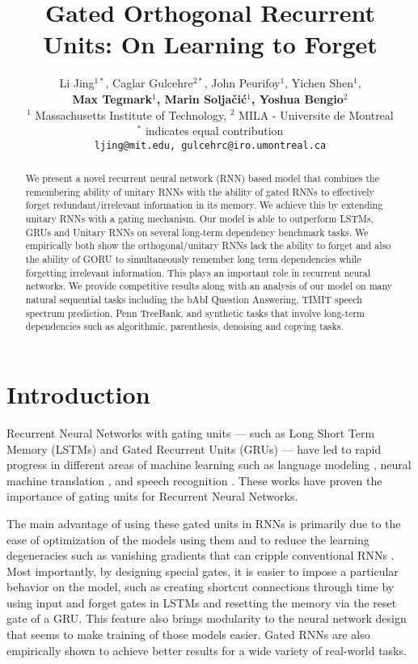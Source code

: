\documentclass[letterpaper]{article} \usepackage{aaai18}  \usepackage{times}  \usepackage{helvet}  \usepackage{courier}  \usepackage{url}  \usepackage{graphicx}
\title{Gated Orthogonal Recurrent Units: On Learning to Forget}
\author{
Li Jing$^{1*}$, Caglar Gulcehre$^{2*}$, John Peurifoy$^1$, Yichen Shen$^1$, \\
{ \bf \Large
  Max Tegmark$^1$,  Marin Solja\v{c}i\'{c}$^1$, Yoshua Bengio$^2$}\\
  $^1$ Massachusetts Institute of Technology,  
  $^2$ MILA - Universite de Montreal \\ 
  $^*$ indicates equal contribution\\
  \texttt{ljing@mit.edu, gulcehrc@iro.umontreal.ca} \\
}
\begin{document}
\maketitle
\begin{abstract}
We present a novel recurrent neural network (RNN) based model that combines the remembering ability of unitary RNNs with the ability of gated RNNs to effectively forget redundant/irrelevant information in its memory.  We achieve this by extending unitary RNNs with a gating mechanism. Our model is able to outperform LSTMs, GRUs and Unitary RNNs on several long-term dependency benchmark tasks. We empirically both show the orthogonal/unitary RNNs lack the ability to forget and also the ability of GORU to simultaneously remember long term dependencies while forgetting irrelevant information. This plays an important role in recurrent neural networks. We provide competitive results along with an analysis of our model on many natural sequential tasks including the bAbI Question Answering, TIMIT speech spectrum prediction, Penn TreeBank, and synthetic tasks that involve long-term dependencies such as algorithmic, parenthesis, denoising and copying tasks.
\end{abstract}


\section{Introduction}





Recurrent Neural Networks with gating units --- such as Long Short Term Memory (LSTMs) \cite{hochreiter1997long,felix2001long} and Gated Recurrent Units (GRUs) \cite{cho2014learning} --- have led to rapid progress in different areas of machine learning such as language modeling \cite{graves2014neural}, neural machine translation \cite{cho2014learning,sutskever2014sequence}, and speech recognition \cite{chan2015listen,chorowski2015attention}. These works have proven the importance of gating units for Recurrent Neural Networks.

The main advantage of using these gated units in RNNs is primarily due to the ease of optimization of the models using them and to reduce the learning degeneracies such as vanishing gradients that can cripple conventional RNNs \cite{pascanu2013difficulty}. Most importantly, by designing special gates, it is easier to impose a particular behavior on the model, such as creating shortcut connections through time by using input and forget gates in LSTMs and resetting the memory via the reset gate of a GRU. This feature also brings modularity to the neural network design that seems to make training of those models easier. Gated RNNs are also empirically shown to achieve better results for a wide variety of real-world tasks.
\end{document}

